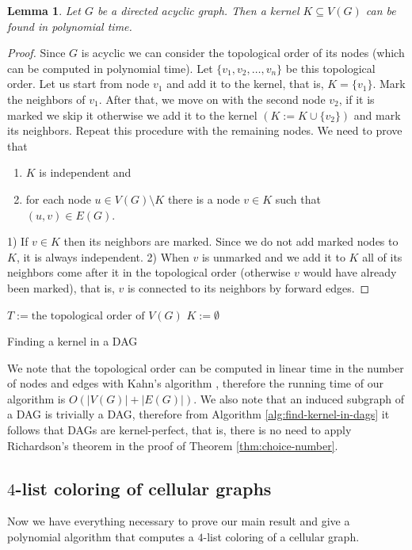\documentclass[a4paper, 12pt]{article}
\newtheorem{lem}{Lemma}[section]
\begin{document}
\begin{lem}\label{lem:kernel-lemma} Let $G$ be a directed acyclic graph. Then a kernel $K \subseteq V(G)$ can be found in polynomial time.
\end{lem}
\begin{proof} Since $G$ is acyclic we can consider the topological order of its nodes (which can be computed in polynomial time). Let $\lbrace v_1, v_2, \ldots, v_n \rbrace$ be this topological order. Let us start from node $v_1$ and add it to the kernel, that is, $K = \lbrace v_1 \rbrace$. Mark the neighbors of $v_1$. After that, we move on with the second node $v_2$, if it is marked we skip it otherwise we add it to the kernel $(K := K \cup \lbrace v_2 \rbrace)$ and mark its neighbors. Repeat this procedure with the remaining nodes. We need to prove that
\begin{enumerate}
\item $K$ is independent and
\item for each node $u \in V(G) \setminus K$ there is a node $v \in K$ such that $(u,v) \in E(G)$.
\end{enumerate}
1) If $v \in K$ then its neighbors are marked. Since we do not add marked nodes to $K$, it is always independent.
2) When $v$ is unmarked and we add it to $K$ all of its neighbors come after it in the topological order (otherwise $v$ would have already been marked), that is, $v$ is connected to its neighbors by forward edges.
\end{proof}
\begin{algorithm}\label{alg:find-kernel-in-dags}
 $T := \text{the topological order of $V(G)$}$\;
 $K := \emptyset$\;
 \caption{Finding a kernel in a DAG}
\end{algorithm}

We note that the topological order can be computed in linear time in the number of nodes and edges with Kahn's algorithm \cite{Kahn:1962:TSL:368996.369025}, therefore the running time of our algorithm is $O(|V(G)|+|E(G)|)$. We also note that an induced subgraph of a DAG is trivially a DAG, therefore from Algorithm \ref{alg:find-kernel-in-dags} it follows that DAGs are kernel-perfect, that is, there is no need to apply Richardson's theorem in the proof of Theorem \ref{thm:choice-number}.
\subsection{$4$-list coloring of cellular graphs}\label{sec:4-list-coloring}
Now we have everything necessary to prove our main result and give a polynomial algorithm that computes a $4$-list coloring of a cellular graph. 
\end{document}

